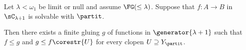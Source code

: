 

\begin{proposition}\label{solvablelambda+1}
Let $\lambda<\omega_1$ be limit or null and assume $\FG(\leq \lambda)$. Suppose that $f:A\to B$ in $\sC_{\lambda+1}$ is solvable with $\partit$.

Then there exists a finite gluing $g$ of functions in $\generator{\lambda+1}$ such that $f\leq g$ and $g\leq f\corestr{U}$ for every clopen $U\supseteq Y_\partit$.
\end{proposition}

